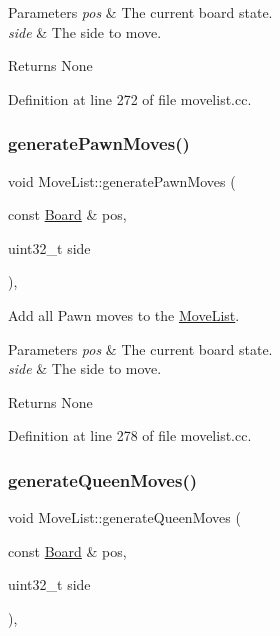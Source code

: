 \begin{DoxyParams}{Parameters}
{\em pos} & The current board state. \\
\hline
{\em side} & The side to move. \\
\hline
\end{DoxyParams}
\begin{DoxyReturn}{Returns}
None 
\end{DoxyReturn}


Definition at line 272 of file movelist.\+cc.

\mbox{\label{classMoveList_a309f4e2408ad522162cda7e2e778d66f}} 
\subsubsection{\texorpdfstring{generate\+Pawn\+Moves()}{generatePawnMoves()}}
{\footnotesize\ttfamily void Move\+List\+::generate\+Pawn\+Moves (\begin{DoxyParamCaption}\item[{const \mbox{\hyperlink{classBoard}{Board}} \&}]{pos,  }\item[{uint32\+\_\+t}]{side }\end{DoxyParamCaption})\hspace{0.3cm}{\ttfamily [private]}, {\ttfamily [noexcept]}}



Add all Pawn moves to the \mbox{\hyperlink{classMoveList}{Move\+List}}. 


\begin{DoxyParams}{Parameters}
{\em pos} & The current board state. \\
\hline
{\em side} & The side to move. \\
\hline
\end{DoxyParams}
\begin{DoxyReturn}{Returns}
None 
\end{DoxyReturn}


Definition at line 278 of file movelist.\+cc.

\mbox{\label{classMoveList_a8f0dedc3c310ad2ce503e9327c089997}} 
\subsubsection{\texorpdfstring{generate\+Queen\+Moves()}{generateQueenMoves()}}
{\footnotesize\ttfamily void Move\+List\+::generate\+Queen\+Moves (\begin{DoxyParamCaption}\item[{const \mbox{\hyperlink{classBoard}{Board}} \&}]{pos,  }\item[{uint32\+\_\+t}]{side }\end{DoxyParamCaption})\hspace{0.3cm}{\ttfamily [private]}, {\ttfamily [noexcept]}}



